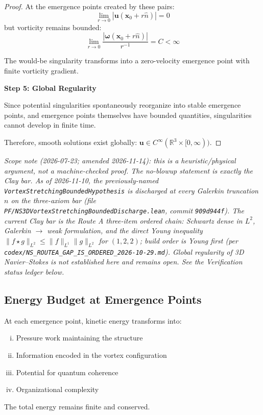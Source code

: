 \begin{proof}
At the emergence points created by these pairs:
\begin{equation}
\lim_{r \to 0} |\mathbf{u}(\mathbf{x}_0 + r\hat{n})| = 0
\end{equation}
but vorticity remains bounded:
\begin{equation}
\lim_{r \to 0} \frac{|\boldsymbol{\omega}(\mathbf{x}_0 + r\hat{n})|}{r^{-1}} = C < \infty
\end{equation}

The would-be singularity transforms into a zero-velocity emergence point with finite vorticity gradient.

\textbf{Step 5: Global Regularity}

Since potential singularities spontaneously reorganize into stable emergence points, and emergence points themselves have bounded quantities, singularities cannot develop in finite time.

Therefore, smooth solutions exist globally: $\mathbf{u} \in C^\infty(\mathbb{R}^3 \times [0, \infty))$.
\end{proof}

\noindent\emph{Scope note (2026-07-23; amended 2026-11-14): this is a heuristic/physical argument, not a machine-checked proof.  The no-blowup statement is exactly the Clay bar.  As of 2026-11-10, the previously-named \texttt{VortexStretchingBoundedHypothesis} is \emph{discharged} at every Galerkin truncation $n$ on the three-axiom bar (file \texttt{PF/NS3DVortexStretchingBoundedDischarge.lean}, commit \texttt{909d944f}).  The current Clay bar is the Route A three-item ordered chain: Schwartz dense in $L^2$, Galerkin $\to$ weak formulation, and the direct Young inequality $\lVert f \star g\rVert_{L^2} \le \lVert f\rVert_{L^1}\lVert g\rVert_{L^2}$ for $(1, 2, 2)$; build order is Young first (per \texttt{codex/NS\_ROUTEA\_GAP\_IS\_ORDERED\_2026-10-29.md}).  Global regularity of 3D Navier--Stokes is not established here and remains open.  See the Verification status ledger below.}

\subsection{Energy Budget at Emergence Points}

\begin{proposition}\label{prop:energy-emergence}
At each emergence point, kinetic energy transforms into:
\begin{enumerate}[(i)]
\item Pressure work maintaining the structure
\item Information encoded in the vortex configuration
\item Potential for quantum coherence
\item Organizational complexity
\end{enumerate}
The total energy remains finite and conserved.
\end{proposition}

